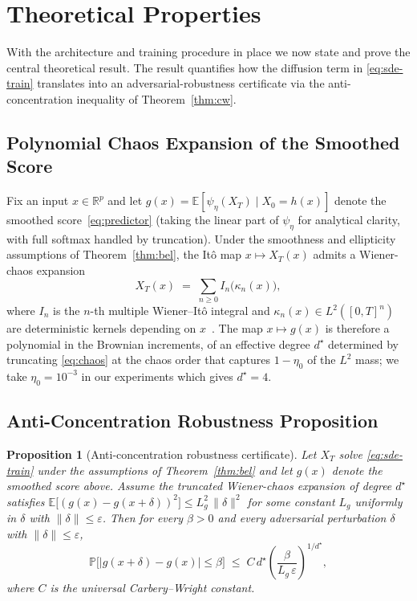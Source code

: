\documentclass[journal,10pt]{IEEEtran}
\newtheorem{proposition}[theorem]{Proposition}
\theoremstyle{definition}
\theoremstyle{remark}
\newcommand{\Real}{\mathbb{R}}
\newcommand{\Exp}{\mathbb{E}}
\newcommand{\Prob}{\mathbb{P}}
\begin{document}
\section{Theoretical Properties}\label{sec:theory}
With the architecture and training procedure in place we now state
and prove the central theoretical result. The result quantifies how
the diffusion term in \eqref{eq:sde-train} translates into an
adversarial-robustness certificate via the anti-concentration
inequality of Theorem~\ref{thm:cw}.

\subsection{Polynomial Chaos Expansion of the Smoothed Score}
Fix an input $x\in\Real^p$ and let $g(x)=\Exp[\psi_\eta(X_T)\mid X_0=h(x)]$
denote the smoothed score~\eqref{eq:predictor} (taking
the linear part of $\psi_\eta$ for analytical clarity, with full
softmax handled by truncation). Under the smoothness and ellipticity
assumptions of Theorem~\ref{thm:bel}, the It\^o map
$x\mapsto X_T(x)$ admits a Wiener-chaos expansion
\begin{equation}\label{eq:chaos}
  X_T(x)\;=\;\sum_{n\geq 0} I_n\bigl(\kappa_n(x)\bigr),
\end{equation}
where $I_n$ is the $n$-th multiple Wiener--It\^o integral and
$\kappa_n(x)\in L^2([0,T]^n)$ are deterministic kernels depending on
$x$~\cite{nualart2006malliavin}. The map
$x\mapsto g(x)$ is therefore a polynomial in the Brownian increments,
of an effective degree $d^\star$ determined by truncating
\eqref{eq:chaos} at the chaos order that captures $1-\eta_0$ of the
$L^2$ mass; we take $\eta_0=10^{-3}$ in our experiments which gives
$d^\star=4$.

\subsection{Anti-Concentration Robustness Proposition}\label{subsec:prop}
\begin{proposition}[Anti-concentration robustness certificate]\label{prop:robust}
Let $X_T$ solve \eqref{eq:sde-train} under the assumptions of
Theorem~\ref{thm:bel} and let $g(x)$ denote the smoothed score above.
Assume the truncated Wiener-chaos expansion of degree $d^\star$
satisfies
$\Exp\bigl[(g(x)-g(x+\delta))^2\bigr] \leq L_g^2\,\|\delta\|^2$
for some constant $L_g$ uniformly in $\delta$ with
$\|\delta\|\leq\varepsilon$.
Then for every $\beta>0$ and every adversarial perturbation
$\delta$ with $\|\delta\|\leq\varepsilon$,
\begin{equation}\label{eq:robust-bound}
   \Prob\!\bigl[|g(x+\delta)-g(x)|\leq\beta\bigr]\;\leq\;
   C\,d^\star\!\left(\frac{\beta}{L_g\,\varepsilon}\right)^{\!1/d^\star},
\end{equation}
where $C$ is the universal Carbery--Wright constant.
\end{proposition}
\end{document}
